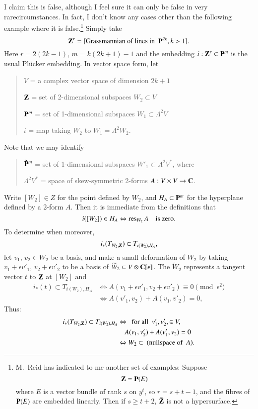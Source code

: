 I claim this is false, although I feel sure it can only be false in
very rare\pageoriginale circumstances. In fact, I don't know any cases
other than the following example where it is
false.\footnote[2]{M.~Reid has indicated to me another set of
examples: Suppose
$$
\mathbf{Z}=\mathbf{P}(E)
$$
where $E$ is a vector bundle of rank $s$ on $y^{t}$, so $r=s+t-1$, and
the fibres of $\mathbf{P}(E)$ are embedded linearly. Then if $s\geq t+2$,
$\check{\mathbf{Z}}$ is not a hypersurface.} Simply take
$$
\mathbf{Z}^{r}=[\text{Grassmannian of lines in~ } \mathbf{P}^{2k}, k>1].
$$
Here $r=2(2k-1)$, $m=k(2k+1)-1$ and the embedding
$i:\mathbf{Z}^{r}\subset \mathbf{P}^{m}$ is the usual Pl\"ucker embedding. In vector
space form, let
\begin{quote}
$V$ = a complex vector space of dimension $2k+1$

$\mathbf{Z}$ = set of 2-dimensional subspaces $W_{2}\subset V$

$\mathbf{P}^{m}$ = set of 1-dimensional subspaces
$W_{1}\subset \Lambda^{2}V$

$i$ = map taking $W_{2}$ to $W_{1}=\Lambda^{2}W_{2}$.
\end{quote}
Note that we may identify
\begin{quote}
$\check{\mathbf{P}}^{m}$ = set of 1-dimensional subspaces
$W'_{1}\subset \Lambda^{2}V^{*}$, where 

$\Lambda^{2}V^{*}$ = space of skew-symmetric 2-forms $A:V\times V\to \mathbf{C}$.
\end{quote}
Write $[W_{2}]\in Z$ for the point defined by $W_{2}$, and
$H_{A}\subset \mathbf{P}^{m}$ for the hyperplane defined by a 2-form
$A$. Then it is immediate from the definitions that
$$
i([W_{2}])\in H_{A}\Leftrightarrow \operatorname{res}_{W_{2}}A\quad\text{is zero.}
$$
To determine when moreover,
$$
i_{*}(T_{W_{2},\mathbf{Z}})\subset T_{i(W_{2}),H_{A}},
$$
let $v_{1}$, $v_{2}\in W_{2}$ be a basis, and make a small deformation
of $W_{2}$ by taking $v_{1}+\epsilon v'_{1}$, $v_{2}+\epsilon v'_{2}$
to be a basis of $\widetilde{W}_{2}\subset
V\otimes \mathbf{C}[\epsilon]$. The $\widetilde{W}_{2}$ represents a tangent
vector $t$ to $\mathbf{Z}$ at $[W_{2}]$ and 
\begin{align*}
i_{*}(t)\subset T_{i(W_{2}),H_{A}} & \Leftrightarrow A(v_{1}+\epsilon
v'_{1},v_{2}+\epsilon v'_{2})\equiv 0\pmod{\epsilon^{2}}\\
& \Leftrightarrow A(v'_{1},v_{2})+A(v_{1},v'_{2})=0,
\end{align*}
Thus:
\begin{align*}
i_{*}(T_{W_{2},\mathbf{Z}})\subset T_{i(W_{2}),H_{A}} & \Leftrightarrow \text{~
for all~ }v'_{1},v'_{2},\in V,\\
&\quad A(v_{1},v'_{2})+A(v'_{1},v_{2})=0\\
&\Leftrightarrow W_{2}\subset \text{~(nullspace of~ $A$)}.
\end{align*}

